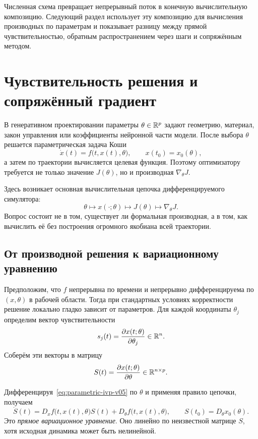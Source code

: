 Численная схема превращает непрерывный поток в конечную вычислительную композицию. Следующий раздел использует эту композицию для вычисления производных по параметрам и показывает разницу между прямой чувствительностью, обратным распространением через шаги и сопряжённым методом.

\section{Чувствительность решения и сопряжённый градиент}
\label{sec:sensitivity-and-adjoint-gradient}

В генеративном проектировании параметры $\theta\in\mathbb{R}^p$ задают геометрию, материал, закон управления или коэффициенты нейронной части модели. После выбора $\theta$ решается параметрическая задача Коши
\begin{equation}
\label{eq:parametric-ivp-v05}
\dot x(t)=f\bigl(t,x(t),\theta\bigr),
\qquad
x(t_0)=x_0(\theta),
\end{equation}
а затем по траектории вычисляется целевая функция. Поэтому оптимизатору требуется не только значение $J(\theta)$, но и производная $\nabla_\theta J$.

Здесь возникает основная вычислительная цепочка дифференцируемого симулятора:
\[
\theta
\longmapsto
x(\cdot;\theta)
\longmapsto
J(\theta)
\longmapsto
\nabla_\theta J.
\]
Вопрос состоит не в том, существует ли формальная производная, а в том, как вычислить её без построения огромного якобиана всей траектории.

\subsection{От производной решения к вариационному уравнению}

Предположим, что $f$ непрерывна по времени и непрерывно дифференцируема по $(x,\theta)$ в рабочей области. Тогда при стандартных условиях корректности решение локально гладко зависит от параметров. Для каждой координаты $\theta_j$ определим вектор чувствительности
\[
s_j(t)
=
\frac{\partial x(t;\theta)}{\partial\theta_j}
\in\mathbb{R}^n.
\]
Соберём эти векторы в матрицу
\begin{equation}
\label{eq:sensitivity-matrix-v05}
S(t)
=
\frac{\partial x(t;\theta)}{\partial\theta}
\in\mathbb{R}^{n\times p}.
\end{equation}

Дифференцируя~\eqref{eq:parametric-ivp-v05} по $\theta$ и применяя правило цепочки, получаем
\begin{equation}
\label{eq:forward-sensitivity-v05}
\dot S(t)
=
D_xf\bigl(t,x(t),\theta\bigr)S(t)
+
D_\theta f\bigl(t,x(t),\theta\bigr),
\qquad
S(t_0)=D_\theta x_0(\theta).
\end{equation}
Это \emph{прямое вариационное уравнение}. Оно линейно по неизвестной матрице $S$, хотя исходная динамика может быть нелинейной.

